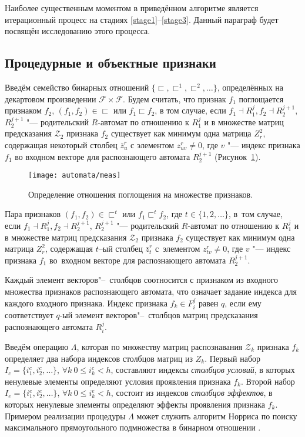 Наиболее существенным моментом в приведённом алгоритме является итерационный процесс на стадиях \ref{stage1}--\ref{stage3}. Данный параграф будет посвящён исследованию этого процесса.

\subsection{Процедурные и объектные признаки}

Введём семейство бинарных отношений $\{\sqsubset,\sqsubset^1,\sqsubset^2,\dots\}$, определённых на декартовом произведении $\mathcal F\times \mathcal F$. Будем считать, что признак $f_1$ поглощается признаком $f_2$, $(f_1,f_2 )\in\sqsubset$ или $f_1\sqsubset f_2$, в том случае, если $f_1\dashv R_1^j, f_2\dashv R_2^{j+1}$, $R_2^{j+1}$ "--- родительский $R$-автомат по отношению к $R_1^j$ и в множестве матриц предсказания $\mathcal Z_2$ признака $f_2$ существует как минимум одна матрица $Z_r^2$, содержащая некоторый столбец $\bar z_u^r$ с элементом $z_{uv}^r\not=0$, где $v$ "--- индекс признака $f_1$ во входном векторе для распознающего автомата $R_2^{j+1}$ (Рисунок~\ref{fig:rb_measure}).

\begin{figure}[h]
	\centering
	\texttt{[image: automata/meas]}
	\caption{Определение отношения поглощения на множестве признаков.}
	\label{fig:rb_measure}
\end{figure}

Пара признаков $(f_1,f_2)\in\sqsubset^t$ или $f_1\sqsubset^t f_2$, где $t\in\{1,2,\dots\}$, в~том случае, если $f_1\dashv R_1^j, f_2\dashv R_2^{j+1}$, $R_2^{j+1}$ "--- родительский $R$-автомат по отношению к $R_1^j$ и в множестве матриц предсказания $\mathcal Z_2$ признака $f_2$ существует как минимум одна матрица $Z_r^2$, содержащая $t$–ый столбец $\bar z_t^r$ с~элементом $z_{tv}^r\not=0$, где $v$ "--- индекс признака $f_1$ во~входном векторе для распознающего автомата $R_2^{j+1}$.

Каждый элемент векторов"--~столбцов соотносится с признаком из входного множества признаков распознающего автомата, что означает задание индекса для каждого входного признака. Индекс признака $f_k\in F_i^j$ равен $q$, если ему соответствует $q$-ый элемент векторов"--~столбцов матриц предсказания распознающего автомата $R_i^j$. 

Введём операцию $\Lambda$, которая по множеству матриц распознавания $\mathcal Z_k$ признака $f_k$ определяет два набора индексов столбцов матриц из $Z_k$. Первый набор $I_c=\{i_1^c,i_2^c,\dots\}$, $\forall k\ 0\leqslant i_k^c < h$, составляют индексы \textit{столбцов условий}, в которых ненулевые элементы определяют условия проявления признака $f_k$. Второй набор $I_e=\{i_1^e,i_2^e,\dots\}$, $\forall k\ 0\leqslant i_k^e < h$, состоит из индексов  \textit{столбцов эффектов}, в которых ненулевые элементы определяют эффекты проявления признака $f_k$. Примером реализации процедуры $\Lambda$ может служить алгоритм Норриса по поиску максимального прямоугольного подмножества в бинарном отношении \cite{Norris1977}.

